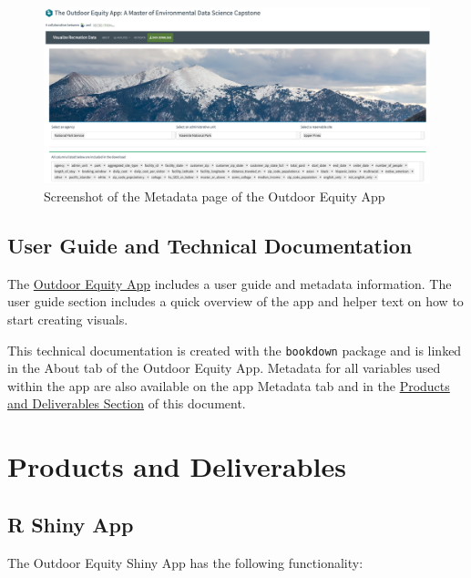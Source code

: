 \documentclass[
]{book}
\begin{document}
\begin{figure}
\includegraphics[width=22.79in]{images/screenshot_data-download} \caption{Screenshot of the Metadata page of the Outdoor Equity App}\label{fig:app-screenshot6}
\end{figure}

\hypertarget{user-guide-and-technical-documentation}{%
\section{User Guide and Technical Documentation}\label{user-guide-and-technical-documentation}}

The \href{https://shinyapps.bren.ucsb.edu/oe_app/}{Outdoor Equity App} includes a user guide and metadata information. The user guide section includes a quick overview of the app and helper text on how to start creating visuals.

This technical documentation is created with the \texttt{bookdown} package \citep{R-bookdown} and is linked in the About tab of the Outdoor Equity App. Metadata for all variables used within the app are also available on the app Metadata tab and in the \protect\hyperlink{products-and-deliverables}{Products and Deliverables Section} of this document.

\hypertarget{products-and-deliverables}{%
\chapter{Products and Deliverables}\label{products-and-deliverables}}

\hypertarget{r-shiny-app}{%
\section{R Shiny App}\label{r-shiny-app}}

The Outdoor Equity Shiny App has the following functionality:
\end{document}
